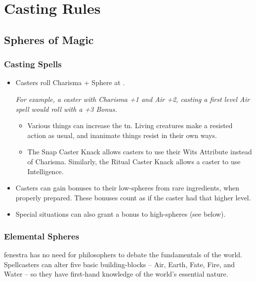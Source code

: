 \chapter{Casting Rules}

\section{Spheres of Magic}

\begin{multicols}{2}

\subsection{Casting Spells}

\begin{itemize}
  \item
  Casters roll Charisma + Sphere at \tn[7].

  \textit{For example, a caster with Charisma +1 and Air +2, casting a first level Air spell would roll with a +3 Bonus.}
  \begin{itemize}
    \item
    Various things can increase the \gls{tn}.
    Living creatures make a resisted action as usual, and inanimate things resist in their own ways.
    \item
    The Snap Caster Knack allows casters to use their Wits Attribute instead of Charisma.
    Similarly, the Ritual Caster Knack allows a caster to use Intelligence.%
  \end{itemize}
  \item
  Casters can gain bonuses to their low-spheres from rare ingredients, when properly prepared.
  These bonuses count as if the caster had that higher level.
  \item
  Special situations can also grant a bonus to high-spheres (see below).
\end{itemize}

\subsection{Elemental Spheres}

\Gls{fenestra} has no need for philosophers to debate the fundamentals of the world.
Spellcasters can alter five basic building-blocks -- Air, Earth, Fate, Fire, and Water -- so they have first-hand knowledge of the world's essential nature.


\end{multicols}
